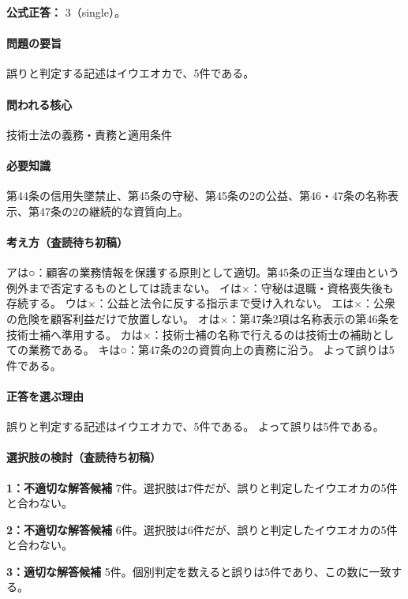 \textbf{公式正答：} 3（single）。

\paragraph{問題の要旨} 誤りと判定する記述はイウエオカで、5件である。

\paragraph{問われる核心} 技術士法の義務・責務と適用条件

\paragraph{必要知識} 第44条の信用失墜禁止、第45条の守秘、第45条の2の公益、第46・47条の名称表示、第47条の2の継続的な資質向上。

\paragraph{考え方（査読待ち初稿）} アは○：顧客の業務情報を保護する原則として適切。第45条の正当な理由という例外まで否定するものとしては読まない。 イは×：守秘は退職・資格喪失後も存続する。 ウは×：公益と法令に反する指示まで受け入れない。 エは×：公衆の危険を顧客利益だけで放置しない。 オは×：第47条2項は名称表示の第46条を技術士補へ準用する。 カは×：技術士補の名称で行えるのは技術士の補助としての業務である。 キは○：第47条の2の資質向上の責務に沿う。 よって誤りは5件である。

\paragraph{正答を選ぶ理由} 誤りと判定する記述はイウエオカで、5件である。  よって誤りは5件である。

\paragraph{選択肢の検討（査読待ち初稿）}\mbox{}\par

\noindent\textbf{1：不適切な解答候補} 7件。選択肢は7件だが、誤りと判定したイウエオカの5件と合わない。\par

\noindent\textbf{2：不適切な解答候補} 6件。選択肢は6件だが、誤りと判定したイウエオカの5件と合わない。\par

\noindent\textbf{3：適切な解答候補} 5件。個別判定を数えると誤りは5件であり、この数に一致する。\par

